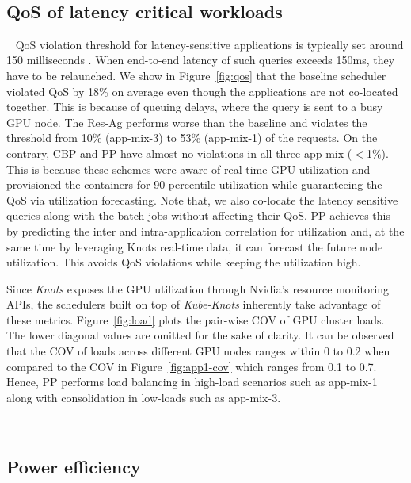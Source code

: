 ~\subsection{QoS of latency critical workloads}
~\label{sec:qos}
QoS violation threshold for latency-sensitive applications is typically set around 150 milliseconds \cite{Dean}. When end-to-end latency of such queries exceeds 150ms, they have to be relaunched. We show in Figure~\ref{fig:qos} that the baseline scheduler violated QoS by 18\% on average even though the applications are not co-located together. This is because of queuing delays, where the query is sent to a busy GPU node. The Res-Ag performs worse than the baseline and violates the threshold from 10\% (app-mix-3) to 53\% (app-mix-1) of the requests. On the contrary, CBP and PP have almost no violations in all three app-mix ($<$1\%). This is because these schemes were aware of real-time GPU utilization and provisioned the containers for 90 percentile utilization while guaranteeing the QoS via utilization forecasting. 
{Note that, we also co-locate the latency sensitive queries along with the batch jobs without affecting their QoS. PP achieves this by predicting the inter and intra-application correlation for utilization and, at the same time by leveraging Knots real-time data, it can forecast the future node utilization. This avoids QoS violations while keeping the utilization high.}

Since \textit{Knots} exposes the GPU utilization through Nvidia's resource monitoring APIs, the schedulers built on top of \textit{Kube-Knots} inherently take advantage of these metrics. Figure~\ref{fig:load} plots the pair-wise COV of GPU cluster loads. The lower diagonal values are omitted for the sake of clarity. It can be observed that the COV of loads across different GPU nodes ranges within 0 to 0.2 when compared to the COV in Figure~\ref{fig:app1-cov} which ranges from 0.1 to 0.7. Hence, PP performs load balancing in high-load scenarios such as app-mix-1 along with consolidation in low-loads such as app-mix-3.




~\subsection{Power efficiency}

